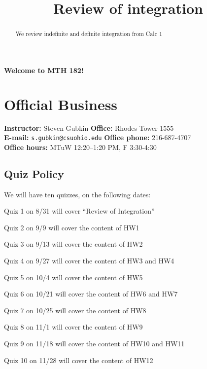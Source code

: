 \documentclass[handout]{ximera}
\title{Review of integration}
\begin{document}
\begin{abstract}
We review indefinite and definite integration from Calc 1
\end{abstract}
\maketitle

\begin{center}
\large{\textbf{Welcome to MTH 182!}}
\end{center}

\section{Official Business}

\begin{tabbing}
	{\bf Instructor:} Steven Gubkin \hspace{1.5in} \=
	{\bf Office:} Rhodes Tower 1555\\ 
	{\bf E-mail:} {\tt s.gubkin@csuohio.edu} \>
	{\bf Office phone:} 216-687-4707\\ 
	{\bf Office hours:} MTuW 12:20--1:20 PM, F 3:30-4:30\\ 
\end{tabbing}

\subsection{Quiz Policy}

We will have ten quizzes, on the following dates:

Quiz 1 on 8/31 will cover ``Review of Integration''

Quiz 2 on 9/9 will cover the content of HW1

Quiz 3 on 9/13 will cover the content of HW2

Quiz 4 on 9/27 will cover the content of  HW3 and HW4

Quiz 5 on 10/4 will cover the content of HW5

Quiz 6 on 10/21 will cover the content of HW6 and HW7

Quiz 7 on 10/25 will cover the content of HW8

Quiz 8 on 11/1 will cover the content of HW9

Quiz 9 on 11/18 will cover the content of HW10 and HW11

Quiz 10 on 11/28 will cover the content of  HW12
\end{document}
